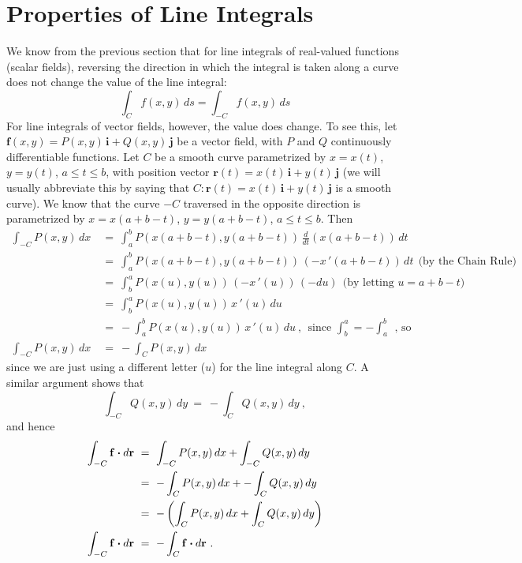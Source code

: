 \section{Properties of Line Integrals}
We know from the previous section that for line integrals of real-valued functions (scalar fields), reversing the
direction in which the integral is taken along a curve does not change the value of the line integral:
\begin{equation}
 \int_C f(x,y)\,ds = \int_{-C} f(x,y)\,ds
\end{equation}
For line integrals of vector fields, however, the value does change. To see this, let $\mathbf{f}(x,y) =
P(x,y)\,\mathbf{i} + Q(x,y)\,\mathbf{j}$ be a vector field, with $P$ and $Q$ continuously differentiable
functions. Let $C$ be a smooth curve parametrized by $x=x(t)$, $y=y(t)$, $a \le t \le b$, with position vector
$\mathbf{r}(t) = x(t)\,\mathbf{i} + y(t)\,\mathbf{j}$ (we will usually abbreviate this by saying that
$C: \mathbf{r}(t) = x(t)\,\mathbf{i} + y(t)\,\mathbf{j}$ is a smooth curve). We know that the curve $-C$ traversed in
the opposite direction is parametrized by $x=x(a+b-t)$, $y=y(a+b-t)$, $a \le t \le b$. Then
\begin{align*}
 \int_{-C} P(x,y)\,dx ~&=~ \int_a^b P(x(a+b-t),y(a+b-t))\,\frac{d}{dt}(x(a+b-t))\,dt\\
  &=~ \int_a^b P(x(a+b-t),y(a+b-t))\,(-x\,'(a+b-t))\,dt~~\text{(by the Chain Rule)}\\
  &=~ \int_b^a P(x(u),y(u))\,(-x\,'(u))\,(-du)~~\text{(by letting $u=a+b-t$)}\\
  &=~ \int_b^a P(x(u),y(u))\,x\,'(u)\,du\\
  &=~ -\int_a^b P(x(u),y(u))\,x\,'(u)\,du~,~~\text{since $\int_b^a = -\int_a^b ~~$, so}\\
  \int_{-C} P(x,y)\,dx ~&=~ -\int_C P(x,y)\,dx
\end{align*}
since we are just using a different letter ($u$) for the line integral along $C$. A similar argument shows that
\begin{displaymath}
 \int_{-C} Q(x,y)\,dy ~=~ -\int_C Q(x,y)\,dy ~,
\end{displaymath}
and hence
\begin{align}
 \int_{-C} \mathbf{f} \bm{\cdot} d\mathbf{r} ~&=~ \int_{-C} P(x,y)\,dx + \int_{-C} Q(x,y)\,dy\notag\\
  &=~ -\int_C P(x,y)\,dx + -\int_C Q(x,y)\,dy\notag\\
  &=~ -\left( \int_C P(x,y)\,dx + \int_C Q(x,y)\,dy \right)\notag\\
  \int_{-C} \mathbf{f} \bm{\cdot} d\mathbf{r} ~&=~ -\int_C \mathbf{f} \bm{\cdot} d\mathbf{r} ~.
\end{align}

